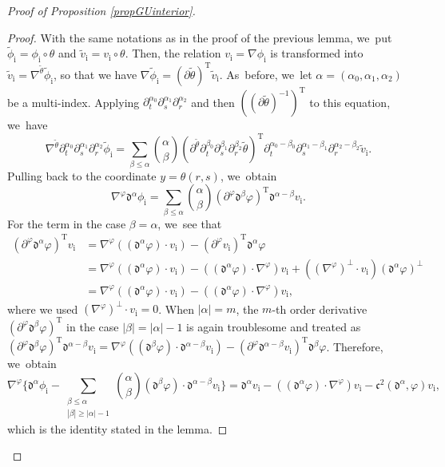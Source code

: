 \documentclass[JEP,XML,SOM,Unicode,NoFloatCountersInSection,published]{cedram}
\newcommand{\dt}{\partial_t}
\theoremstyle{definition}
\begin{document}
\begin{proof}[Proof of Proposition \ref{propGUinterior}]
\begin{proof}
With the same notations as in the proof of the previous lemma, we~put $\tilde{\phi}_\mathrm{i}=\phi_\mathrm{i}\circ\theta$ and $\tilde{v}_\mathrm{i}=v_\mathrm{i}\circ\theta$.
Then, the relation $v_\mathrm{i}=\nabla\phi_\mathrm{i}$ is transformed into $\tilde{v}_\mathrm{i}=\nabla^{\tilde{\theta}}\tilde{\phi}_\mathrm{i}$,
so that we have $\nabla\tilde{\phi}_\mathrm{i}=(\partial\tilde{\theta})^\mathrm{T}\tilde{v}_\mathrm{i}$. As~before, we~let $\alpha=(\alpha_0,\alpha_1,\alpha_2)$ be a multi-index.
Applying $\dt^{\alpha_0}\partial_s^{\alpha_1}\partial_r^{\alpha_2}$ and then $((\partial\tilde{\theta})^{-1})^\mathrm{T}$ to this equation, we~have
\[
\nabla^{\tilde{\theta}}\dt^{\alpha_0}\partial_s^{\alpha_1}\partial_r^{\alpha_2}\tilde{\phi}_\mathrm{i}
= \sum_{\beta\leq\alpha} \binom{\alpha}{\beta} (\partial^{\tilde{\theta}}\dt^{\beta_0}\partial_s^{\beta_1}\partial_r^{\beta_2}\tilde{\theta})^\mathrm{T}
\dt^{\alpha_0-\beta_0}\partial_s^{\alpha_1-\beta_1}\partial_r^{\alpha_2-\beta_2}\tilde{v}_\mathrm{i}.
\]
Pulling back to the coordinate $y=\theta(r,s)$, we~obtain
\[
\nabla^\varphi\mathfrak{d}^{\alpha}\phi_\mathrm{i}
= \sum_{\beta\leq\alpha} \binom{\alpha}{\beta} (\partial^\varphi\mathfrak{d}^{\beta}\varphi)^\mathrm{T}\mathfrak{d}^{\alpha-\beta}v_\mathrm{i}.
\]
For the term in the case $\beta=\alpha$, we~see that
\begin{align*}
(\partial^\varphi\mathfrak{d}^{\alpha}\varphi)^\mathrm{T}v_\mathrm{i}
&= \nabla^\varphi((\mathfrak{d}^{\alpha}\varphi)\cdot v_\mathrm{i}) - (\partial^\varphi v_\mathrm{i})^\mathrm{T}\mathfrak{d}^{\alpha}\varphi \\
&= \nabla^\varphi((\mathfrak{d}^{\alpha}\varphi)\cdot v_\mathrm{i}) - ((\mathfrak{d}^{\alpha}\varphi)\cdot\nabla^\varphi)v_\mathrm{i}
+ ((\nabla^\varphi)^\perp\cdot v_\mathrm{i})(\mathfrak{d}^{\alpha}\varphi)^\perp \\
&= \nabla^\varphi((\mathfrak{d}^{\alpha}\varphi)\cdot v_\mathrm{i}) - ((\mathfrak{d}^{\alpha}\varphi)\cdot\nabla^\varphi)v_\mathrm{i},
\end{align*}
where we used $(\nabla^\varphi)^\perp\cdot v_\mathrm{i}=0$.
When $|\alpha|=m$, the $m$-th order derivative $(\partial^\varphi\mathfrak{d}^{\beta}\varphi)^\mathrm{T}$ in the case $|\beta|=|\alpha|-1$
is again troublesome and treated as $(\partial^\varphi\mathfrak{d}^{\beta}\varphi)^\mathrm{T}\mathfrak{d}^{\alpha-\beta}v_\mathrm{i}
= \nabla^\varphi((\mathfrak{d}^{\beta}\varphi)\cdot\mathfrak{d}^{\alpha-\beta}v_\mathrm{i})
- (\partial^\varphi\mathfrak{d}^{\alpha-\beta}v_\mathrm{i})^\mathrm{T}\mathfrak{d}^{\beta}\varphi$.
Therefore, we~obtain
\[
\nabla^\varphi\biggl\{ \mathfrak{d}^{\alpha}\phi_\mathrm{i}
- \sum_{\substack{\beta\leq\alpha\\ |\beta|\geq|\alpha|-1}} \binom{\alpha}{\beta} (\mathfrak{d}^{\beta}\varphi)\cdot\mathfrak{d}^{\alpha-\beta}v_\mathrm{i} \biggr\}
= \mathfrak{d}^{\alpha}v_\mathrm{i} - ((\mathfrak{d}^{\alpha}\varphi)\cdot\nabla^\varphi)v_\mathrm{i} -\mathfrak{c}^2({\mathfrak d}^\alpha,\varphi)v_\mathrm{i},
\]
which is the identity stated in the lemma.
\end{proof}


\end{proof}
\end{document}
